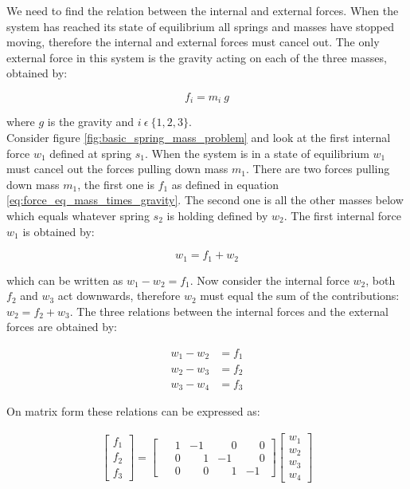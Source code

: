 We need to find the relation between the internal and external
forces. When the system has reached its state of equilibrium all
springs and masses have stopped moving, therefore the internal and external
forces must cancel out. The only external force in this
system is the gravity acting on each of the three masses, obtained by:

\begin{equation}
\label{eq:force_eq_mass_times_gravity}
f_i = m_i \ g
\end{equation}

where $g$ is the gravity and $i \ \epsilon \ \lbrace 1,2,3
\rbrace$.\\

Consider figure \vref{fig:basic_spring_mass_problem} and look at the
first internal force $w_1$ defined at spring $s_1$. When the system is
in a state of equilibrium $w_1$ must cancel out the forces pulling
down mass $m_1$. There are two forces pulling down mass $m_1$, the first
one is $f_1$ as defined in equation
\eqref{eq:force_eq_mass_times_gravity}. The second one is all the 
other masses below which equals whatever spring $s_2$ is
holding defined by $w_2$. The first internal force $w_1$ is obtained by:

\begin{equation}  
\label{eq:w1_equal_e2_times_f1}
w_1 = f_1 + w_2
\end{equation}

which can be written as $w_1 - w_2 = f_1$. Now consider the internal
force $w_2$, both $f_2$ and $w_3$ act downwards, therefore $w_2$ must
equal the sum of the contributions: $w_2 = f_2 +w_3$. The three relations
between the internal forces and the external forces are obtained by: 

\begin{align*}
w_1 - w_2 &= f_1 \\
w_2 - w_3 &= f_2 \\
w_3 - w_4 &= f_3
\end{align*}

On matrix form these relations can be expressed as:

\begin{align}
\begin{bmatrix}
f_1 \\ f_2\\ f_3
\end{bmatrix}
=
\begin{bmatrix}
  \phantom{-}1 &           -1 & \phantom{-}0 & \phantom{-}0 \\
  \phantom{-}0 & \phantom{-}1 &           -1 & \phantom{-}0 \\
  \phantom{-}0 & \phantom{-}0 & \phantom{-}1 &           -1 
\end{bmatrix}
\begin{bmatrix}
w_1 \\ w_2 \\ w_3 \\ w_4
\end{bmatrix}
\end{align}

